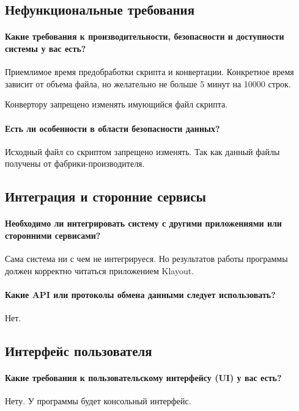 \subsection{Нефункциональные требования}

\paragraph{Какие требования к производительности,
	безопасности и доступности системы у вас есть?}
Приемлимое время предобработки скрипта и конвертации.
Конкретное время зависит от объема файла,
но желательно не больше 5 минут на 10000 строк.\par
Конвертору запрещено изменять имующийся файл скрипта.

\paragraph{Есть ли особенности в области безопасности данных?}
Исходный файл со скриптом запрещено изменять. Так как данный файлы получены
от фабрики-производителя.

\subsection{Интеграция и сторонние сервисы}

\paragraph{Необходимо ли интегрировать систему с другими приложениями
	или сторонними сервисами?}
Сама система ни с чем не интегрируеся. Но результатов работы 
программы должен корректно читаться приложением Klayout.

\paragraph{Какие API или протоколы обмена данными следует использовать?}
Нет.

\subsection{Интерфейс пользователя}

\paragraph{Какие требования к пользовательскому интерфейсу (UI) у вас есть?}
Нету. У программы будет консольный интерфейс.

